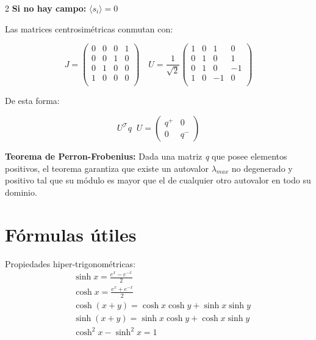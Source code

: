 \documentclass[a4, 12pt]{article}
\begin{document}
\begin{multicols}{2}
    \textbf{Si no hay campo:} $\langle s_i \rangle = 0$

    Las matrices centrosimétricas conmutan con:

    \begin{equation*}
      J = \begin{pmatrix}
        0 & 0 & 0 & 1 \\
        0 & 0 & 1 & 0 \\
        0 & 1 & 0 & 0 \\
        1 & 0 & 0 & 0 \\
      \end{pmatrix} \quad
      U = \frac{1}{\sqrt{2}} \begin{pmatrix}
        1 & 0 & 1 & 0 \\
        0 & 1 & 0 & 1 \\
        0 & 1 & 0 & -1 \\
        1 & 0 & -1 & 0 \\
      \end{pmatrix}
    \end{equation*}

    De esta forma:
    
    \begin{equation*}
      U^{\mathcal{T}}q\;\;U = \begin{pmatrix} q^{+} & 0 \\ 0 & q^{-}\end{pmatrix}
    \end{equation*}

    \textbf{Teorema de Perron-Frobenius:}
	  Dada una matriz \textit{q} que posee elementos positivos, el teorema garantiza que existe un autovalor $\lambda_{max}$ no degenerado y positivo tal que su módulo es mayor que el de cualquier otro autovalor en todo su dominio.
    
    \section*{Fórmulas útiles}
    Propiedades hiper-trigonométricas:
    \begin{equation*}
      \begin{aligned}
      &\sinh{x} = \frac{e^{x} - e^{-x}}{2}\\
      &\cosh{x} = \frac{e^{x} + e^{-x}}{2}\\
      &\cosh(x + y) = \cosh{x}\cosh{y} + \sinh{x}\sinh{y} \\
      &\sinh(x + y) = \sinh{x}\cosh{y} + \cosh{x}\sinh{y} \\
      &\cosh^{2}{x} - \sinh^{2}{x} = 1
      \end{aligned}
    \end{equation*}


\end{multicols}
\end{document}

